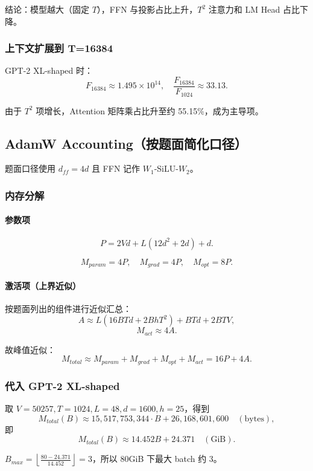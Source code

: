 \documentclass[UTF8,11pt,a4paper]{ctexart}
\begin{document}
结论：模型越大（固定 \(T\)），FFN 与投影占比上升，\(T^2\) 注意力和 LM Head 占比下降。

\subsubsection{上下文扩展到 T=16384}

GPT-2 XL-shaped 时：
\[
F_{16384} \approx 1.495\times 10^{14},\quad
\frac{F_{16384}}{F_{1024}}\approx 33.13.
\]

由于 \(T^2\) 项增长，Attention 矩阵乘占比升至约 55.15\%，成为主导项。

\subsection{AdamW Accounting（按题面简化口径）}

题面口径使用 \(d_{ff}=4d\) 且 FFN 记作 \(W_1\)-SiLU-\(W_2\)。

\subsubsection{内存分解}

\paragraph{参数项}
\[
P = 2Vd + L(12d^2 + 2d) + d.
\]

\[
M_{param}=4P,\quad M_{grad}=4P,\quad M_{opt}=8P.
\]

\paragraph{激活项（上界近似）}
按题面列出的组件进行近似汇总：
\[
A \approx L(16BTd + 2BhT^2) + BTd + 2BTV,
\]
\[
M_{act}\approx 4A.
\]

故峰值近似：
\[
M_{total}\approx M_{param}+M_{grad}+M_{opt}+M_{act}=16P+4A.
\]

\subsubsection{代入 GPT-2 XL-shaped}

取 \(V=50257,T=1024,L=48,d=1600,h=25\)，得到
\[
M_{total}(B)\approx 15{,}517{,}753{,}344\cdot B + 26{,}168{,}601{,}600\quad (\text{bytes}),
\]
即
\[
M_{total}(B)\approx 14.452B + 24.371\quad (\text{GiB}).
\]

\(
B_{max}=\left\lfloor\frac{80-24.371}{14.452}\right\rfloor=3
\)，所以 80GiB 下最大 batch 约 3。
\end{document}
